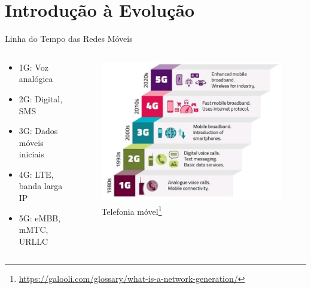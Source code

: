 \section{Introdução à Evolução}

\begin{frame}{Linha do Tempo das Redes Móveis}
\begin{columns}
    \begin{column}{0.45\textwidth}
        \begin{itemize}
            \item 1G: Voz analógica
            \item 2G: Digital, SMS
            \item 3G: Dados móveis iniciais
            \item 4G: LTE, banda larga IP
            \item 5G: eMBB, mMTC, URLLC
        \end{itemize}        
    \end{column}
    \begin{column}{0.55\textwidth}
        \vspace{1cm}
        \begin{figure}
            \centering
            \includegraphics[width=\linewidth]{figs/Network-Generation-Progression.jpg}
            \caption{Telefonia móvel\footnote{\href{https://galooli.com/glossary/what-is-a-network-generation/}{https://galooli.com/glossary/what-is-a-network-generation/}}}
            \label{fig:placeholder}
        \end{figure}
    \end{column}
\end{columns}

\end{frame}

